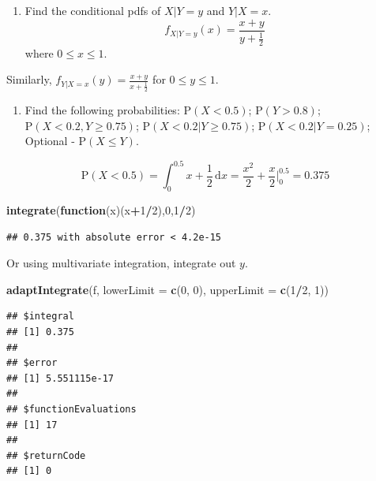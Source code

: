 \documentclass[
]{book}
\newenvironment{Shaded}{\begin{snugshade}}{\end{snugshade}}
\newcommand{\ControlFlowTok}[1]{\textcolor[rgb]{0.13,0.29,0.53}{\textbf{#1}}}
\newcommand{\DataTypeTok}[1]{\textcolor[rgb]{0.13,0.29,0.53}{#1}}
\newcommand{\DecValTok}[1]{\textcolor[rgb]{0.00,0.00,0.81}{#1}}
\newcommand{\KeywordTok}[1]{\textcolor[rgb]{0.13,0.29,0.53}{\textbf{#1}}}
\newcommand{\NormalTok}[1]{#1}
\newcommand{\OperatorTok}[1]{\textcolor[rgb]{0.81,0.36,0.00}{\textbf{#1}}}
\providecommand{\tightlist}{%
  \setlength{\itemsep}{0pt}\setlength{\parskip}{0pt}}
\begin{document}
\begin{enumerate}
\def\labelenumi{\alph{enumi}.}
\setcounter{enumi}{2}
\tightlist
\item
  Find the conditional pdfs of \(X|Y=y\) and \(Y|X=x\).
  \[
  f_{X|Y=y}(x)=\frac{x+y}{y+\frac{1}{2}}
  \]
  where \(0\leq x \leq 1\).
\end{enumerate}

Similarly, \(f_{Y|X=x}(y)=\frac{x+y}{x+\frac{1}{2}}\) for \(0\leq y \leq 1\).

\begin{enumerate}
\def\labelenumi{\alph{enumi}.}
\setcounter{enumi}{3}
\tightlist
\item
  Find the following probabilities: \(\mbox{P}(X<0.5)\); \(\mbox{P}(Y>0.8)\); \(\mbox{P}(X<0.2,Y\geq 0.75)\); \(\mbox{P}(X<0.2|Y\geq 0.75)\); \(\mbox{P}(X<0.2|Y= 0.25)\); Optional - \(\mbox{P}(X\leq Y)\).
\end{enumerate}

\[
\mbox{P}(X<0.5)=\int_0^{0.5} x+\frac{1}{2}\,\mathrm{d}x = \frac{x^2}{2}+\frac{x}{2}\bigg|_0^{0.5}=0.375
\]

\begin{Shaded}
\begin{Highlighting}[]
\KeywordTok{integrate}\NormalTok{(}\ControlFlowTok{function}\NormalTok{(x)(x}\OperatorTok{+}\DecValTok{1}\OperatorTok{/}\DecValTok{2}\NormalTok{),}\DecValTok{0}\NormalTok{,}\DecValTok{1}\OperatorTok{/}\DecValTok{2}\NormalTok{)}
\end{Highlighting}
\end{Shaded}

\begin{verbatim}
## 0.375 with absolute error < 4.2e-15
\end{verbatim}

Or using multivariate integration, integrate out \(y\).

\begin{Shaded}
\begin{Highlighting}[]
\KeywordTok{adaptIntegrate}\NormalTok{(f, }\DataTypeTok{lowerLimit =} \KeywordTok{c}\NormalTok{(}\DecValTok{0}\NormalTok{, }\DecValTok{0}\NormalTok{), }\DataTypeTok{upperLimit =} \KeywordTok{c}\NormalTok{(}\DecValTok{1}\OperatorTok{/}\DecValTok{2}\NormalTok{, }\DecValTok{1}\NormalTok{))}
\end{Highlighting}
\end{Shaded}

\begin{verbatim}
## $integral
## [1] 0.375
## 
## $error
## [1] 5.551115e-17
## 
## $functionEvaluations
## [1] 17
## 
## $returnCode
## [1] 0
\end{verbatim}
\end{document}
